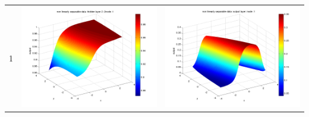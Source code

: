 \documentclass[fleqn]{article}
\begin{document}
\begin{center}
\begin{longtable}{ c | c | r }
1}  & \includegraphics[scale=0.25]{./pics/nonlinearlyseparable/_4_2/_4_2_epoch_10_hidden layer 2 :21} & \includegraphics[scale=0.25]{./pics/nonlinearlyseparable/_4_2/_4_2_epoch_10_output layer :1}\\ 

\end{longtable}
\end{center}
\end{document}
